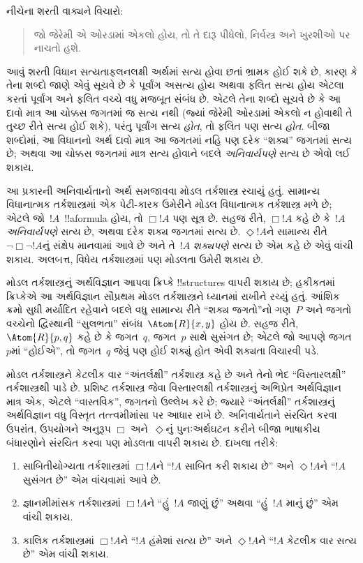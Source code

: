 \documentclass[../../../include/open-logic-section]{subfiles}
\begin{document}


નીચેના શરતી વાક્યને વિચારો:
\begin{quote}
  જો જેરેમી એ ઓરડામાં એકલો હોય, તો તે દારૂ પીધેલો, નિર્વસ્ત્ર અને
  ખુરશીઓ પર નાચતો હશે.
\end{quote}
આવું શરતી વિધાન સત્યતાફલનલક્ષી અર્થમાં સત્ય હોવા છતાં ભ્રામક હોઈ શકે
છે, કારણ કે તેના શબ્દો જાણે એવું સૂચવે છે કે પૂર્વાંગ અસત્ય હોય અથવા
ફલિત સત્ય હોય એટલા કરતાં પૂર્વાંગ અને ફલિત વચ્ચે વધુ મજબૂત સંબંધ છે.
એટલે તેના શબ્દો સૂચવે છે કે આ દાવો માત્ર આ ચોક્કસ જગતમાં જ સત્ય નથી
(જ્યાં જેરેમી ઓરડામાં એકલો ન હોવાથી તે તુચ્છ રીતે સત્ય હોઈ શકે), પરંતુ
પૂર્વાંગ સત્ય \emph{હોત}, તો ફલિત પણ સત્ય \emph{હોત}. બીજા શબ્દોમાં,
આ વિધાનનો અર્થ દાવો માત્ર આ જગતમાં નહિ પણ દરેક ``શક્ય'' જગતમાં સત્ય
છે; અથવા આ ચોક્કસ જગતમાં માત્ર સત્ય હોવાને બદલે \emph{અનિવાર્યપણે}
સત્ય છે એવો લઈ શકાય.

આ પ્રકારની અનિવાર્યતાનો અર્થ સમજાવવા મોડલ તર્કશાસ્ત્ર રચાયું હતું.
સામાન્ય વિધાનાત્મક તર્કશાસ્ત્રમાં એક પેટી-કારક ઉમેરીને મોડલ
વિધાનાત્મક તર્કશાસ્ત્ર મળે છે; એટલે જો~$!A$~!!a{formula} હોય, તો
$\Box !A$ પણ સૂત્ર છે. સહજ રીતે, $\Box !A$ કહે છે કે~$!A$
\emph{અનિવાર્યપણે} સત્ય છે, અથવા દરેક શક્ય જગતમાં સત્ય છે.
$\Diamond !A$ને સામાન્ય રીતે $\lnot \Box \lnot !A$નું સંક્ષેપ માનવામાં
આવે છે અને તે~$!A$ \emph{શક્યપણે} સત્ય છે એમ કહે છે એવું વાંચી શકાય.
અલબત્ત, વિધેય તર્કશાસ્ત્રમાં પણ મોડલતા ઉમેરી શકાય છે.

મોડલ તર્કશાસ્ત્રનું અર્થવિજ્ઞાન આપવા ક્રિપ્કે !!{structure}s વાપરી
શકાય છે; હકીકતમાં ક્રિપ્કેએ આ અર્થવિજ્ઞાન સૌપ્રથમ મોડલ તર્કશાસ્ત્રને
ધ્યાનમાં રાખીને રચ્યું હતું. આંશિક ક્રમો સુધી મર્યાદિત રહેવાને બદલે
વધુ સામાન્ય રીતે ``શક્ય જગતો''નો ગણ~$P$ અને જગતો વચ્ચેનો દ્વિસ્થાની
``સુલભતા'' સંબંધ~$\Atom{R}{x,y}$ હોય છે. સહજ રીતે,
$\Atom{R}{p,q}$ કહે છે કે જગત~$q$, જગત~$p$ સાથે સુસંગત છે; એટલે જો
આપણે જગત~$p$માં ``હોઈએ'', તો જગત~$q$ જેવું પણ હોઈ શક્યું હોત એવી
શક્યતા વિચારવી પડે.

મોડલ તર્કશાસ્ત્રને કેટલીક વાર ``અંતર્લક્ષી'' તર્કશાસ્ત્ર કહે છે અને
તેનો ભેદ ``વિસ્તારલક્ષી'' તર્કશાસ્ત્રથી પાડે છે. પ્રશિષ્ટ તર્કશાસ્ત્ર
જેવા વિસ્તારલક્ષી તર્કશાસ્ત્રનું અભિપ્રેત અર્થવિજ્ઞાન માત્ર એક, એટલે
``વાસ્તવિક'', જગતનો ઉલ્લેખ કરે છે; જ્યારે ``અંતર્લક્ષી'' તર્કશાસ્ત્રનું
અર્થવિજ્ઞાન વધુ વિસ્તૃત તત્ત્વમીમાંસા પર આધાર રાખે છે. અનિવાર્યતાને
સંરચિત કરવા ઉપરાંત, ઉપયોગને અનુરૂપ $\Box$ અને~$\Diamond$નું પુનઃઅર્થઘટન
કરીને બીજા ભાષાકીય બંધારણોને સંરચિત કરવા પણ મોડલતા વાપરી શકાય છે.
દાખલા તરીકે:

\begin{enumerate}
\item સાબિતીયોગ્યતા તર્કશાસ્ત્રમાં $\Box !A$ને ``$!A$ સાબિત કરી શકાય
  છે'' અને $\Diamond !A$ને ``$!A$ સુસંગત છે'' એમ વાંચવામાં આવે છે.
\item જ્ઞાનમીમાંસક તર્કશાસ્ત્રમાં $\Box !A$ને ``હું~$!A$ જાણું છું''
  અથવા ``હું~$!A$ માનું છું'' એમ વાંચી શકાય.
\item કાલિક તર્કશાસ્ત્રમાં $\Box !A$ને ``$!A$ હંમેશાં સત્ય છે'' અને
  $\Diamond !A$ને ``$!A$ કેટલીક વાર સત્ય છે'' એમ વાંચી શકાય.
\end{enumerate}
\end{document}
